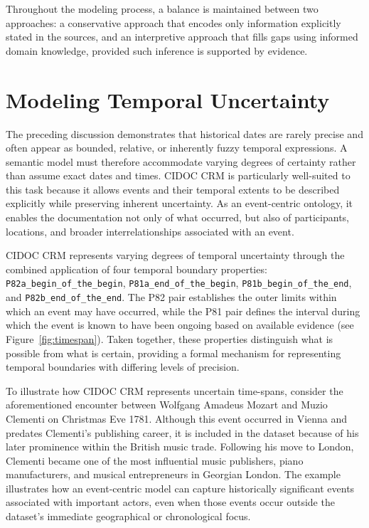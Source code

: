 \documentclass[final]{anthology-ch} %
\begin{document}
Throughout the modeling process, a balance is maintained between two approaches: a conservative approach that encodes only information explicitly stated in the sources, and an interpretive approach that fills gaps using informed domain knowledge, provided such inference is supported by evidence.

\section{Modeling Temporal Uncertainty} \label{sec:modeling-uncertainty}

The preceding discussion demonstrates that historical dates are rarely precise and often appear as bounded, relative, or inherently fuzzy temporal expressions. A semantic model must therefore accommodate varying degrees of certainty rather than assume exact dates and times. CIDOC CRM is particularly well-suited to this task because it allows events and their temporal extents to be described explicitly while preserving inherent uncertainty. As an event-centric ontology, it enables the documentation not only of what occurred, but also of participants, locations, and broader interrelationships associated with an event.

\begin{sloppypar}
CIDOC CRM represents varying degrees of temporal uncertainty through the combined application of four temporal boundary properties: \texttt{P82a\_begin\_of\_the\_begin}, \texttt{P81a\_end\_of\_the\_begin}, \texttt{P81b\_begin\_of\_the\_end}, and \texttt{P82b\_end\_of\_the\_end}. The P82 pair establishes the outer limits within which an event may have occurred, while the P81 pair defines the interval during which the event is known to have been ongoing based on available evidence (see Figure~\ref{fig:timespan}). Taken together, these properties distinguish what is possible from what is certain, providing a formal mechanism for representing temporal boundaries with differing levels of precision.
\end{sloppypar}

To illustrate how CIDOC CRM represents uncertain time-spans, consider the aforementioned encounter between Wolfgang Amadeus Mozart and Muzio Clementi on Christmas Eve 1781. Although this event occurred in Vienna and predates Clementi's publishing career, it is included in the dataset because of his later prominence within the British music trade. Following his move to London, Clementi became one of the most influential music publishers, piano manufacturers, and musical entrepreneurs in Georgian London. The example illustrates how an event-centric model can capture historically significant events associated with important actors, even when those events occur outside the dataset's immediate geographical or chronological focus.
\end{document}
